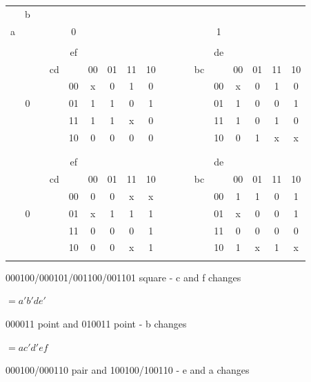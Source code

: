 \documentclass{article}
\begin{document}
    \begin{center}
        \begin{tabular} {cc|ccc|ccccccccc|cccc}
            &b&&& &&& &&& &&& &&& \\
            a&&&& 0&&& &&& &&&1 &&& \\

            \hline

            &&&&&&&&&&&&&&&&& \\
            &&&& ef & &&&&                    &&&& de & &&& \\
            &&&cd && 00 & 01 & 11 & 10 &&     &&bc && 00 & 01 & 11 & 10 \\
            \hline
            &&&& 00 & x & 0 & 1 & 0 &&&       && 00 & x & 0 & 1 & 0 \\
            &0&&& 01 & 1 & 1 & 0 & 1 &&&      && 01 & 1 & 0 & 0 & 1 \\
            &&&& 11 & 1 & 1 & x & 0 &&&      && 11 & 1 & 0 & 1 & 0 \\
            &&&& 10 & 0 & 0 & 0 & 0 &&&       && 10 & 0 & 1 & x & x \\
            &&&&&&&&&&&&&&&&& \\

            &&&&&&&&&&&&&&&&& \\
            &&&& ef & &&&&                    &&&& de & &&& \\
            &&&cd && 00 & 01 & 11 & 10 &&     &&bc && 00 & 01 & 11 & 10 \\
            \hline
            &&&& 00 & 0 & 0 & x & x &&&       && 00 & 1 & 1 & 0 & 1 \\
            &0&&& 01 & x & 1 & 1 & 1 &&&      && 01 & x & 0 & 0 & 1 \\
            &&&& 11 & 0 & 0 & 0 & 1 &&&       && 11 & 0 & 0 & 0 & 0 \\
            &&&& 10 & 0 & 0 & x & 1 &&&       && 10 & 1 & x & 1 & x \\
            &&&&&&&&&&&&&&&&& \\
        \end{tabular}
    \end{center}

    000100/000101/001100/001101 square - c and f changes

    \quad\quad $=a'b'de'$

    000011 point and 010011 point - b changes

    \quad\quad $=ac'd'ef$

    000100/000110 pair and 100100/100110 - e and a changes
\end{document}
